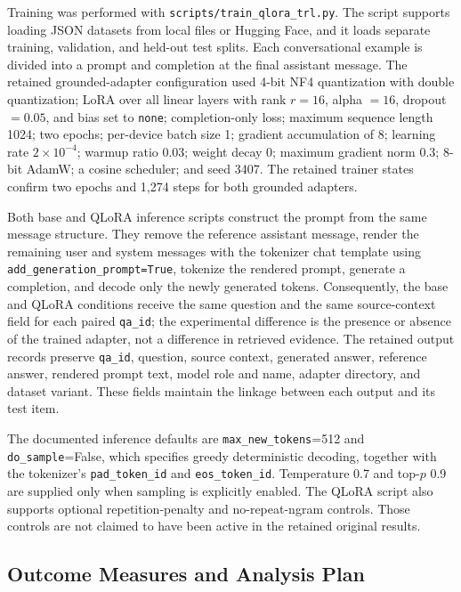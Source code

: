 Training was performed with \texttt{scripts/train\_qlora\_trl.py}. The script supports loading JSON datasets from local files or Hugging Face, and it loads separate training, validation, and held-out test splits. Each conversational example is divided into a prompt and completion at the final assistant message. The retained grounded-adapter configuration used 4-bit NF4 quantization with double quantization; LoRA over all linear layers with rank $r=16$, alpha $=16$, dropout $=0.05$, and bias set to \texttt{none}; completion-only loss; maximum sequence length 1024; two epochs; per-device batch size 1; gradient accumulation of 8; learning rate $2\times10^{-4}$; warmup ratio 0.03; weight decay 0; maximum gradient norm 0.3; 8-bit AdamW; a cosine scheduler; and seed 3407. The retained trainer states confirm two epochs and 1,274 steps for both grounded adapters.

Both base and QLoRA inference scripts construct the prompt from the same message structure. They remove the reference assistant message, render the remaining user and system messages with the tokenizer chat template using \texttt{add\_generation\_prompt=True}, tokenize the rendered prompt, generate a completion, and decode only the newly generated tokens. Consequently, the base and QLoRA conditions receive the same question and the same source-context field for each paired \texttt{qa\_id}; the experimental difference is the presence or absence of the trained adapter, not a difference in retrieved evidence. The retained output records preserve \texttt{qa\_id}, question, source context, generated answer, reference answer, rendered prompt text, model role and name, adapter directory, and dataset variant. These fields maintain the linkage between each output and its test item.

The documented inference defaults are \texttt{max\_new\_tokens}=512 and \texttt{do\_sample}=False, which specifies greedy deterministic decoding, together with the tokenizer's \texttt{pad\_token\_id} and \texttt{eos\_token\_id}. Temperature 0.7 and top-$p$ 0.9 are supplied only when sampling is explicitly enabled. The QLoRA script also supports optional repetition-penalty and no-repeat-ngram controls. Those controls are not claimed to have been active in the retained original results.

\subsection{Outcome Measures and Analysis Plan}

